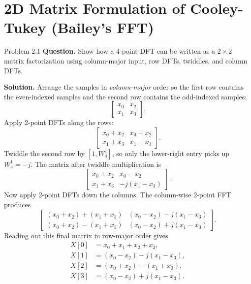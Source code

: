 \documentclass[10pt]{article}
\newcommand{\Prompt}[1]{\textbf{Question.} #1}
\newcommand{\SketchLabel}{\tcblower\textbf{Solution.}}
\begin{document}
\section{2D Matrix Formulation of Cooley-Tukey (Bailey's FFT)}

\begin{examplebox}{Problem 2.1}
  \Prompt{Show how a 4-point DFT can be written as a \(2\times 2\) matrix factorization using column-major input, row DFTs, twiddles, and column DFTs.}

  \medskip
  \SketchLabel{}
  Arrange the samples in \emph{column-major} order so the first row contains the even-indexed samples and the second row contains the odd-indexed samples:
  \[
    \begin{bmatrix}
      x_0 & x_2\\
      x_1 & x_3
    \end{bmatrix}.
  \]
  Apply 2-point DFTs along the rows:
  \[
    \begin{bmatrix}
      x_0+x_2 & x_0-x_2\\
      x_1+x_3 & x_1-x_3
    \end{bmatrix}.
  \]
  Twiddle the second row by \([1,W_4^1]\), so only the lower-right entry picks up \(W_4^1=-j\). The matrix after twiddle multiplication is
  \[
    \begin{bmatrix}
      x_0+x_2 & x_0-x_2\\
      x_1+x_3 & -j(x_1-x_3)
    \end{bmatrix}.
  \]
  Now apply 2-point DFTs down the columns. The column-wise 2-point FFT produces
  \[
    \begin{bmatrix}
      (x_0+x_2)+(x_1+x_3) & (x_0-x_2)-j(x_1-x_3)\\
      (x_0+x_2)-(x_1+x_3) & (x_0-x_2)+j(x_1-x_3)
    \end{bmatrix}.
  \]
  Reading out this final matrix in row-major order gives
  \[
    \begin{aligned}
      X[0]&=x_0+x_1+x_2+x_3,\\
      X[1]&=(x_0-x_2)-j(x_1-x_3),\\
      X[2]&=(x_0+x_2)-(x_1+x_3),\\
      X[3]&=(x_0-x_2)+j(x_1-x_3).
    \end{aligned}
  \]


\end{examplebox}
\end{document}
